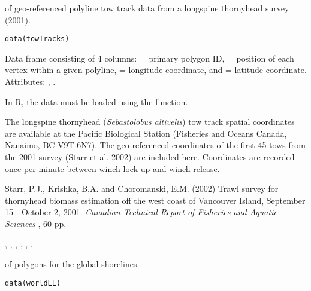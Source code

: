 \documentclass[letterpaper]{book}
\begin{document}
%
\begin{Description}\relax
{} of geo-referenced polyline tow track data from a
longspine thornyhead survey (2001).
\end{Description}
%
\begin{Usage}
\begin{verbatim}
data(towTracks)
\end{verbatim}
\end{Usage}
%
\begin{Format}
Data frame consisting of 4 columns:  = primary polygon ID,
 = position of each vertex within a given polyline, 
= longitude coordinate, and  = latitude
coordinate. Attributes: , .
\end{Format}
%
\begin{Note}\relax
In R, the data must be loaded using the  function.
\end{Note}
%
\begin{Source}\relax
The longspine thornyhead (\emph{Sebastolobus altivelis}) tow
track spatial coordinates are available at the Pacific Biological
Station (Fisheries and Oceans Canada, Nanaimo, BC V9T 6N7). The
geo-referenced coordinates of the first 45 tows from the 2001 survey (Starr
et al. 2002) are included here. Coordinates are recorded once per
minute between winch lock-up and winch release.
\end{Source}
%
\begin{References}\relax
Starr, P.J., Krishka, B.A. and Choromanski, E.M. (2002) Trawl survey
for thornyhead biomass estimation off the west coast of Vancouver
Island, September 15 - October 2, 2001. \emph{Canadian Technical Report of
Fisheries and Aquatic Sciences} , 60 pp.
\end{References}
%
\begin{SeeAlso}\relax
{},
,
,
,
,
.
\end{SeeAlso}
%
\begin{Description}\relax
{} of polygons for the global shorelines.
\end{Description}
%
\begin{Usage}
\begin{verbatim}
data(worldLL)
\end{verbatim}
\end{Usage}
\end{document}
